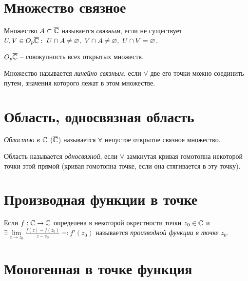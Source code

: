 \section{Множество связное}

\begin{definition}
	Множество $A \subset \overline{\mathbb{C}}$ называется \emph{связным}, если не существует $U,V \in O_p \overline{\mathbb{C}}: \ U \cap A \ne \varnothing, \ V \cap A \ne \varnothing, \ U \cap V = \varnothing$.

	\begin{notation}
		$O_p \overline{\mathbb{C}}$ -- совокупность всех открытых множеств.
	\end{notation}
\end{definition}

\begin{definition}
	Множество называется \emph{линейно связным}, если $\forall $ две его точки можно соединить путем, значения которого лежат в этом множестве.
\end{definition}

\section{Область, односвязная область}

\begin{definition}
	\emph{Областью в $\mathbb{C}$} ($\overline{\mathbb{C}}$) называется $\forall $ непустое открытое связное множество.

	Область называется \emph{односвязной}, если $\forall $ замкнутая кривая гомотопна некоторой точки этой прямой (кривая гомотопна точке, если она стягивается в эту точку).
\end{definition}

\section{Производная функции в точке}

\begin{definition}
	Если $f: \mathbb{C} \rightarrow \mathbb{C}$ определена в некоторой окрестности точки $z_0 \in \mathbb{C}$ и $\exists \underset{z \rightarrow z_0}{\lim}\frac{f(z) - f(z_0)}{z - z_0} \eqqcolon f'(z_0)$ называется \emph{производной функции в точке} $z_0$.
\end{definition}

\newpage

\section{Моногенная в точке функция}


